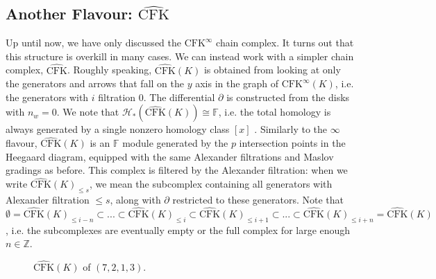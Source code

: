 \documentclass[reqno, 12pt]{amsart}
\theoremstyle{remark}
\begin{document}
\subsection{Another Flavour:  $\widehat{\text{CFK}}$}
Up until now, we have only discussed the  $\text{CFK}^{\infty}$ chain complex. It turns out that this structure is overkill in many cases. We can instead work with a simpler chain complex,  $\widehat{\text{CFK}}$. Roughly speaking,  $\widehat{\text{CFK}}(K)$ is obtained from looking at only the generators and arrows that fall on the $y$ axis in the graph of  $\text{CFK}^{\infty}(K)$, i.e. the generators with $i$ filtration $0$. The differential $\partial$ is constructed from the disks with $n_w = 0$. We note that $\mathcal{H}_{*}(\widehat{\text{CFK}}(K)) \cong \mathbb{F}$, i.e. the total homology is always generated by a single nonzero homology class $[x]$ \cite[Section~2]{OzsvathSzabo2017}. Similarly to the $\infty$ flavour, $\widehat{\text{CFK}}(K)$ is an $\mathbb{F}$ module generated by the $p$ intersection points in the Heegaard diagram, equipped with the same Alexander filtrations and Maslov gradings as before. This complex is filtered by the Alexander filtration: when we write $\widehat{\text{CFK}}(K)_{\le s}$, we mean the subcomplex containing all generators with Alexander filtration $\le s$, along with $\partial$ restricted to these generators. Note that $\emptyset = \widehat{\text{CFK}}(K)_{\le i-n} \subset ... \subset \widehat{\text{CFK}}(K)_{\le i} \subset \widehat{\text{CFK}}(K)_{\le i +1} \subset ... \subset  \widehat{\text{CFK}}(K)_{\le i+n}  = \widehat{\text{CFK}}(K)$, i.e. the subcomplexes are eventually empty or the full complex for large enough $n \in \mathbb{Z}$.
	\begin{figure}[H]
		\centering
		\caption{$\widehat{\text{CFK}}(K)$ of $(7, 2, 1, 3)$.}
		\label{fig:fig17}
	\end{figure}
\end{document}
